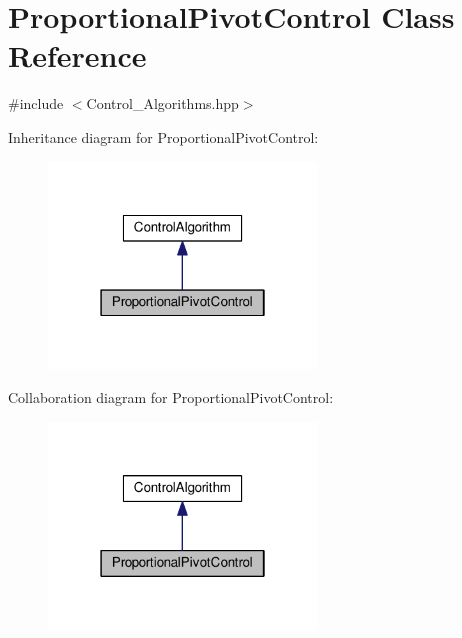 \hypertarget{classProportionalPivotControl}{}\section{Proportional\+Pivot\+Control Class Reference}
\label{classProportionalPivotControl}


{\ttfamily \#include $<$Control\+\_\+\+Algorithms.\+hpp$>$}



Inheritance diagram for Proportional\+Pivot\+Control\+:\nopagebreak
\begin{figure}[H]
\begin{center}
\leavevmode
\includegraphics[width=202pt]{classProportionalPivotControl__inherit__graph}
\end{center}
\end{figure}


Collaboration diagram for Proportional\+Pivot\+Control\+:
\nopagebreak
\begin{figure}[H]
\begin{center}
\leavevmode
\includegraphics[width=202pt]{classProportionalPivotControl__coll__graph}
\end{center}
\end{figure}

